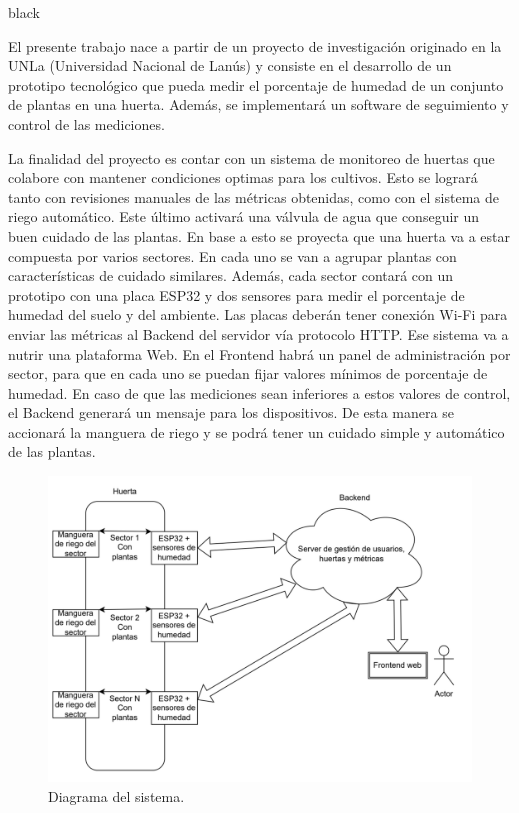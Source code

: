 \documentclass[
11pt, %
codirector, %
]{charter}
\begin{document}
\begin{consigna}{black} %

El presente trabajo nace a partir de un proyecto de investigación originado en la UNLa (Universidad Nacional de Lanús) y consiste en el desarrollo de un prototipo tecnológico que pueda medir el porcentaje de humedad de un conjunto de plantas en una huerta. Además, se implementará un software de seguimiento y control de las mediciones.

La finalidad del proyecto es contar con un sistema de monitoreo de huertas que colabore con mantener condiciones optimas para los cultivos. Esto se logrará tanto con revisiones manuales de las métricas obtenidas, como con el sistema de riego automático. Este último activará una válvula de agua que conseguir un buen cuidado de las plantas.
En base a esto se proyecta que una huerta va a estar compuesta por varios sectores. En cada uno se van a agrupar plantas con características de cuidado similares. Además, cada sector contará con un prototipo con una placa ESP32 y dos sensores para medir el porcentaje de humedad del suelo y del ambiente. Las placas deberán tener conexión Wi-Fi para enviar las métricas al Backend del servidor vía protocolo HTTP. Ese sistema va a nutrir una plataforma Web. En el Frontend habrá un panel de administración por sector, para que en cada uno se puedan fijar valores mínimos de porcentaje de humedad. En caso de que las mediciones sean inferiores a estos valores de control, el Backend generará un mensaje para los dispositivos. De esta manera se accionará la manguera de riego y se podrá tener un cuidado simple y automático de las plantas.



\begin{figure}[htpb]
\centering 
\includegraphics[width=.9\textwidth]{./Figuras/diagBloques.png}
\caption{Diagrama del sistema.}
\label{fig:diagBloques}
\end{figure}

\vspace{25px}

\end{consigna}
\end{document}
